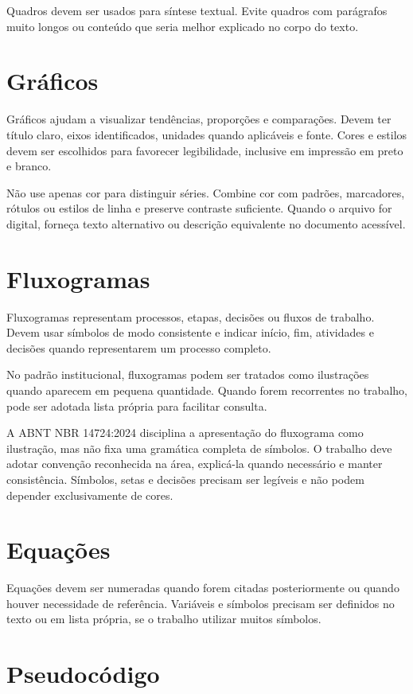 Quadros devem ser usados para síntese textual. Evite quadros com parágrafos muito longos ou conteúdo que seria melhor explicado no corpo do texto.

\section{Gráficos}

Gráficos ajudam a visualizar tendências, proporções e comparações. Devem ter título claro, eixos identificados, unidades quando aplicáveis e fonte. Cores e estilos devem ser escolhidos para favorecer legibilidade, inclusive em impressão em preto e branco.

Não use apenas cor para distinguir séries. Combine cor com padrões, marcadores, rótulos ou estilos de linha e preserve contraste suficiente. Quando o arquivo for digital, forneça texto alternativo ou descrição equivalente no documento acessível.

\section{Fluxogramas}

Fluxogramas representam processos, etapas, decisões ou fluxos de trabalho. Devem usar símbolos de modo consistente e indicar início, fim, atividades e decisões quando representarem um processo completo.

No padrão institucional, fluxogramas podem ser tratados como ilustrações quando aparecem em pequena quantidade. Quando forem recorrentes no trabalho, pode ser adotada lista própria para facilitar consulta.

A ABNT NBR 14724:2024 disciplina a apresentação do fluxograma como ilustração, mas não fixa uma gramática completa de símbolos. O trabalho deve adotar convenção reconhecida na área, explicá-la quando necessário e manter consistência. Símbolos, setas e decisões precisam ser legíveis e não podem depender exclusivamente de cores.

\section{Equações}

Equações devem ser numeradas quando forem citadas posteriormente ou quando houver necessidade de referência. Variáveis e símbolos precisam ser definidos no texto ou em lista própria, se o trabalho utilizar muitos símbolos.

\section{Pseudocódigo}

